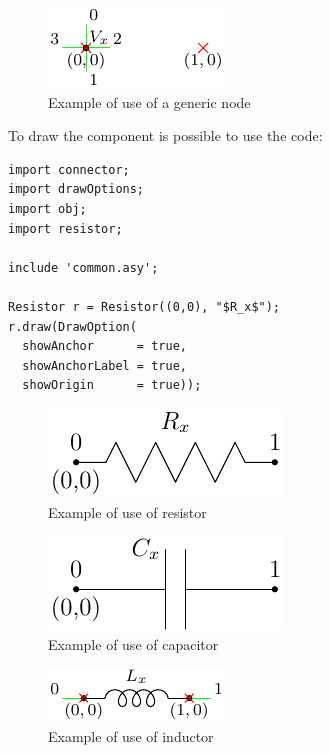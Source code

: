 \documentclass[a4paper,12pt]{report}
\begin{document}
\begin{figure}[h]
\centering
\includegraphics{nodeInfo}
\caption{Example of use of a generic node}
\label{nodeInfo} %
\end{figure}

To draw the component is possible to use the code:

\begin{lstlisting}
import connector;
import drawOptions;
import obj;
import resistor;

include 'common.asy';

Resistor r = Resistor((0,0), "$R_x$");
r.draw(DrawOption(
  showAnchor      = true,
  showAnchorLabel = true,
  showOrigin      = true));
\end{lstlisting}

\begin{figure}[h]
\centering
\includegraphics{resistorInfo}
\caption{Example of use of resistor}
\label{resistorInfo} %
\end{figure}

\begin{figure}[h]
\centering
\includegraphics{capacitorInfo}
\caption{Example of use of capacitor}
\label{capaciorInfo} %
\end{figure}

\begin{figure}[h]
\centering
\includegraphics{inductorInfo}
\caption{Example of use of inductor}
\label{inductorInfo} %
\end{figure}
\end{document}
